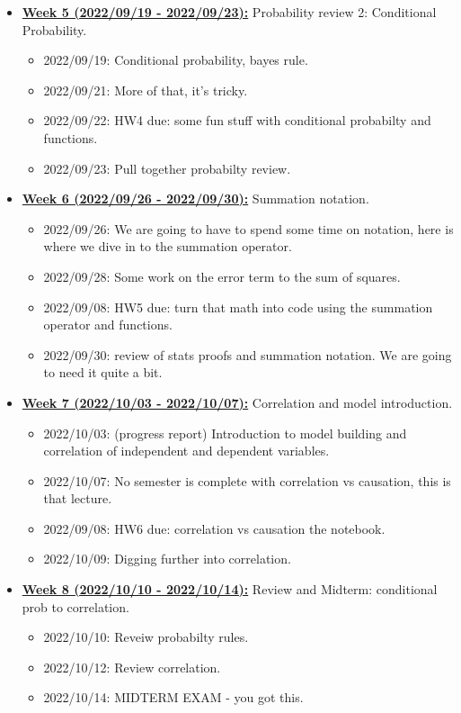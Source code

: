 \documentclass[11pt]{article}
\begin{document}
\begin{itemize}
  \item \underline{\textbf{Week 5 (2022/09/19 - 2022/09/23):}} Probability review 2: Conditional Probability.
  \begin{itemize}
    \item 2022/09/19: Conditional probability, bayes rule.
    \item 2022/09/21: More of that, it's tricky. 
    \item 2022/09/22: HW4 due: some fun stuff with conditional probabilty and functions.
    \item 2022/09/23: Pull together probabilty review. 
  \end{itemize}


  \item \underline{\textbf{Week 6 (2022/09/26 - 2022/09/30):}} Summation notation. 
  \begin{itemize}
    \item 2022/09/26: We are going to have to spend some time on notation, here is where we dive  in to the summation operator.
    \item 2022/09/28: Some work on the error term to the sum of squares. 
    \item 2022/09/08: HW5 due: turn that math into code using the summation operator and functions.
    \item 2022/09/30: review of stats proofs and summation notation. We are going to need it quite a bit. 
  \end{itemize}


  \item \underline{\textbf{Week 7 (2022/10/03 - 2022/10/07):}} Correlation and model introduction. 
  \begin{itemize}
    \item 2022/10/03: (progress report) Introduction to model building and correlation of independent and dependent variables.
    \item 2022/10/07: No semester is complete with correlation vs causation, this is that lecture. 
    \item 2022/09/08: HW6 due: correlation vs causation the notebook. 
    \item 2022/10/09: Digging further into correlation. 
  \end{itemize}

  \item \underline{\textbf{Week 8 (2022/10/10 - 2022/10/14):}} Review and Midterm: conditional prob to correlation.
  \begin{itemize}
    \item 2022/10/10: Reveiw probabilty rules. 
    \item 2022/10/12: Review correlation. 
    \item 2022/10/14: MIDTERM EXAM - you got this. 
  \end{itemize}


\end{itemize}
\end{document}
